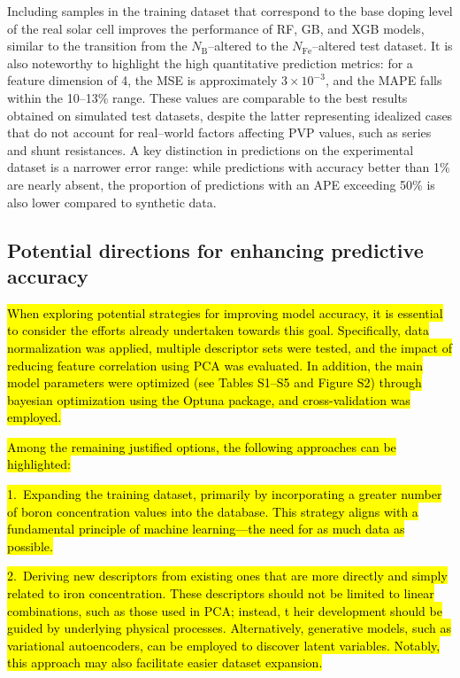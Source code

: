 \documentclass[a4paper,fleqn,draft]{cas-sc}
\begin{document}
Including samples in the training dataset that correspond to the base doping level of the real solar cell
improves the performance of RF, GB, and XGB models,
similar to the transition from the $N_\mathrm{B}$--altered to the $N_\mathrm{Fe}$--altered test dataset.
It is also noteworthy to highlight the high quantitative prediction metrics:
for a feature dimension of 4, the MSE is approximately  $3\times10^{-3}$, and the MAPE falls within the 10--13\% range.
These values are comparable to the best results obtained on simulated test datasets,
despite the latter representing idealized cases that do not account for real--world factors affecting PVP values,
such as series and shunt resistances.
A key distinction in predictions on the experimental dataset is a narrower error range:
while predictions with accuracy better than 1\% are nearly absent,
the proportion of predictions with an APE exceeding 50\% is also lower compared to synthetic data.


\begin{tcolorbox}
\textcolor[rgb]{1.00,0.07,0.00}{
\subsection{Potential directions for enhancing predictive accuracy}
}\end{tcolorbox}


\textcolor[rgb]{1.00,0.07,0.00}{
\hl{
When exploring potential strategies for improving model accuracy,
it is essential to consider the efforts already undertaken towards this goal.
Specifically, data normalization was applied,
multiple descriptor sets were tested, and the impact of reducing feature correlation using PCA was evaluated.
In addition, the main model parameters were optimized (see Tables S1–S5 and Figure S2)
through bayesian optimization using the Optuna package, and cross-validation was employed.
}}

\textcolor[rgb]{1.00,0.07,0.00}{
\hl{
Among the remaining justified options, the following approaches can be highlighted:
}}


\noindent
\textcolor[rgb]{1.00,0.07,0.00}{
\hl{
1.~Expanding the training dataset, primarily by incorporating a greater number of boron concentration values into the database.
This strategy aligns with a fundamental principle of machine learning—the need for as much data as possible.
}}



\noindent
\textcolor[rgb]{1.00,0.07,0.00}{
\hl{
2.~Deriving new descriptors from existing ones that are more directly and simply related to iron concentration.
These descriptors should not be limited to linear combinations, such as those used in PCA; instead, t
heir development should be guided by underlying physical processes.
Alternatively, generative models, such as variational autoencoders,
can be employed to discover latent variables.
Notably, this approach may also facilitate easier dataset expansion.
}}
\end{document}
